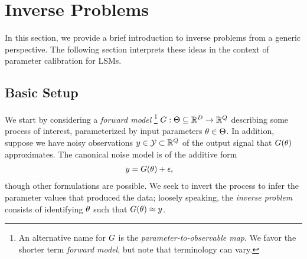 \documentclass[12pt]{article}
\begin{document}
\section{Inverse Problems}
In this section, we provide a brief introduction to inverse problems from a generic perspective. The following section 
interprets these ideas in the context of parameter calibration for LSMs. 

\subsection{Basic Setup}
We start by considering a \textit{forward model} 
\footnote{An alternative name for $G$ is the \textit{parameter-to-observable map}. We favor the shorter term 
\textit{forward model}, but note that terminology can vary.}
$G: \Theta \subseteq \mathbb{R}^{D} \to \mathbb{R}^{Q}$ describing some 
process of interest, parameterized by input parameters $\theta \in \Theta$. In addition, suppose we have noisy 
observations $y \in \mathcal{Y} \subset \mathbb{R}^{Q}$ of the output signal that $G(\theta)$ approximates. 
The canonical noise model is of the additive form 
\begin{align}
y &= G(\theta) + \epsilon,
\end{align}
though other formulations are possible. 
We seek to invert the process to infer the parameter values that produced the data; loosely speaking, the 
\textit{inverse problem} consists of identifying $\theta$ such that $G(\theta) \approx y$. 
\end{document}
